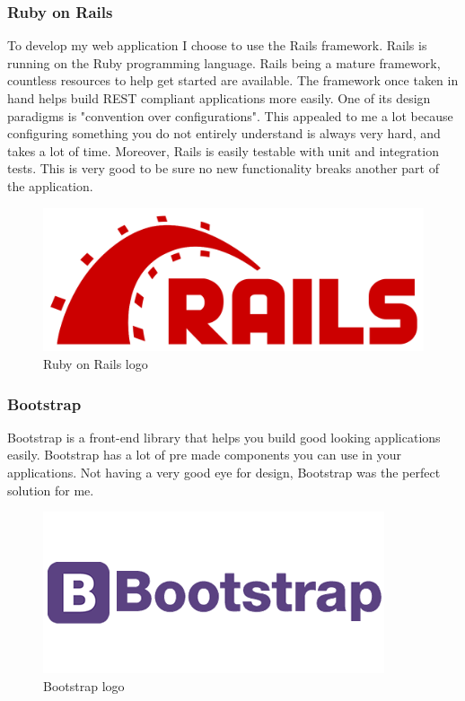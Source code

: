 \documentclass[12pt,a4paper]{article}
\begin{document}
\subsubsection{Ruby on Rails}
To develop my web application I choose to use the Rails framework.
Rails is running on the Ruby programming language. Rails being a mature
framework, countless resources to help get started are available. The framework
once taken in hand helps build REST compliant applications more easily. One
of its design paradigms is "convention over configurations". This appealed to
me a lot because configuring something you do not entirely understand is always very
hard, and takes a lot of time. Moreover, Rails is easily testable with unit and
integration tests. This is very good to be sure no new functionality breaks
another part of the application.

\begin{figure}[h]
   \centering
   \includegraphics[scale=0.1]{src/rails_logo.png}
   \caption{\label{fig:rlogo} Ruby on Rails logo}
\end{figure}


\subsubsection{Bootstrap}

Bootstrap is a front-end library that helps you build good looking applications
easily. Bootstrap has a lot of pre made components you can use in your
applications. Not having a very good eye for design, Bootstrap was the perfect
solution for me.

\begin{figure}[h]
   \centering
   \includegraphics[scale=0.5]{src/bootstrap_logo.png}
   \caption{\label{fig:blogo} Bootstrap logo}
\end{figure}
\end{document}
